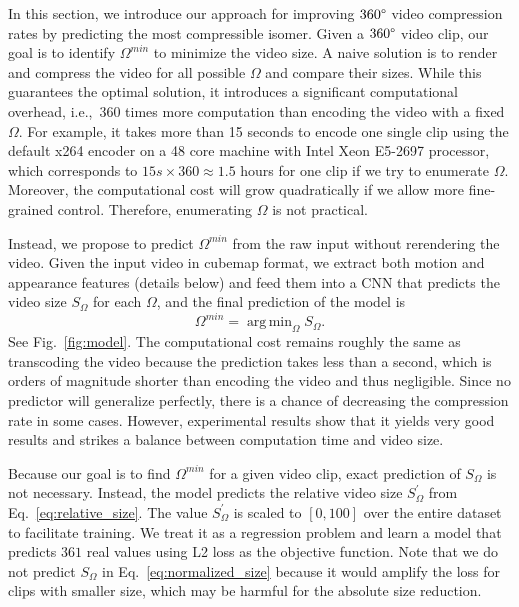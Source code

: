 \documentclass[journal,transmag]{IEEEtran}
\DeclareMathOperator*{\argmin}{arg\,min}
\begin{document}
In this section,
we introduce our approach for improving $360\degree$ video compression rates by predicting the most compressible isomer.
Given a $360\degree$ video clip,
our goal is to identify $\Omega^{min}$ to minimize the video size.
A naive solution is to render and compress the video for all possible $\Omega$ and compare their sizes.
While this guarantees the optimal solution,
it introduces a significant computational overhead, i.e.,~360 times more computation than encoding the video with a fixed $\Omega$.
For example,
it takes more than 15 seconds to encode one single clip using the default x264 encoder on a 48 core machine with Intel Xeon E5-2697 processor,
which corresponds to $15s \times 360 \approx 1.5$ hours for one clip if we try to enumerate $\Omega$.
Moreover, the computational cost will grow quadratically if we allow more fine-grained control.
Therefore, enumerating $\Omega$ is not practical.

Instead, we propose to predict $\Omega^{min}$ from the raw input without rerendering the video.
Given the input video in cubemap format,
we extract both motion and appearance features (details below) and feed them into a CNN that predicts the video size $S_{\Omega}$ for each $\Omega$,
and the final prediction of the model is
\begin{equation}
    \Omega^{min} = \argmin_{\Omega} S_{\Omega}.
\end{equation}
See Fig.~\ref{fig:model}.
The computational cost remains roughly the same as transcoding the video because the prediction takes less than a second,
which is orders of magnitude shorter than encoding the video and thus negligible.  
Since no predictor will generalize perfectly, there is a chance of decreasing the compression rate in some cases.
However, experimental results show that it yields very good results and strikes a balance between computation time and video size.

Because our goal is to find $\Omega^{min}$ for a given video clip,
exact prediction of $S_{\Omega}$ is not necessary.
Instead,
the model predicts the relative video size $S^{\prime}_{\Omega}$ from Eq.~\ref{eq:relative_size}.
The value $S^{\prime}_{\Omega}$ is scaled to $[0, 100]$ over the entire dataset to facilitate training.
We treat it as a regression problem and learn a model that predicts $361$ real values using L2 loss as the objective function.
Note that we do not predict $S_{\Omega}$ in Eq.~\ref{eq:normalized_size} because it would amplify the loss for clips with smaller size,
which may be harmful for the absolute size reduction.
\end{document}
